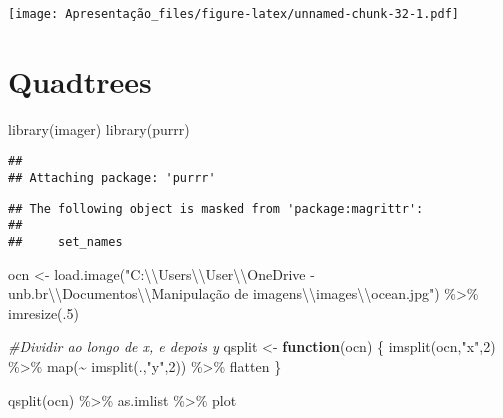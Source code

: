 \documentclass[
]{article}
\newenvironment{Shaded}{\begin{snugshade}}{\end{snugshade}}
\newcommand{\CommentTok}[1]{\textcolor[rgb]{0.56,0.35,0.01}{\textit{#1}}}
\newcommand{\ControlFlowTok}[1]{\textcolor[rgb]{0.13,0.29,0.53}{\textbf{#1}}}
\newcommand{\DecValTok}[1]{\textcolor[rgb]{0.00,0.00,0.81}{#1}}
\newcommand{\FunctionTok}[1]{\textcolor[rgb]{0.00,0.00,0.00}{#1}}
\newcommand{\NormalTok}[1]{#1}
\newcommand{\OtherTok}[1]{\textcolor[rgb]{0.56,0.35,0.01}{#1}}
\newcommand{\SpecialCharTok}[1]{\textcolor[rgb]{0.00,0.00,0.00}{#1}}
\newcommand{\StringTok}[1]{\textcolor[rgb]{0.31,0.60,0.02}{#1}}
\begin{document}
\texttt{[image: Apresentação\_files/figure-latex/unnamed-chunk-32-1.pdf]}

\hypertarget{quadtrees}{%
\section{Quadtrees}\label{quadtrees}}

\begin{Shaded}
\begin{Highlighting}[]
\FunctionTok{library}\NormalTok{(imager)}
\FunctionTok{library}\NormalTok{(purrr)}
\end{Highlighting}
\end{Shaded}

\begin{verbatim}
## 
## Attaching package: 'purrr'
\end{verbatim}

\begin{verbatim}
## The following object is masked from 'package:magrittr':
## 
##     set_names
\end{verbatim}

\begin{Shaded}
\begin{Highlighting}[]
\NormalTok{ocn }\OtherTok{\textless{}{-}} \FunctionTok{load.image}\NormalTok{(}\StringTok{"C:}\SpecialCharTok{\textbackslash{}\textbackslash{}}\StringTok{Users}\SpecialCharTok{\textbackslash{}\textbackslash{}}\StringTok{User}\SpecialCharTok{\textbackslash{}\textbackslash{}}\StringTok{OneDrive {-} unb.br}\SpecialCharTok{\textbackslash{}\textbackslash{}}\StringTok{Documentos}\SpecialCharTok{\textbackslash{}\textbackslash{}}\StringTok{Manipulação de imagens}\SpecialCharTok{\textbackslash{}\textbackslash{}}\StringTok{images}\SpecialCharTok{\textbackslash{}\textbackslash{}}\StringTok{ocean.jpg"}\NormalTok{) }\SpecialCharTok{\%\textgreater{}\%} \FunctionTok{imresize}\NormalTok{(.}\DecValTok{5}\NormalTok{)}

\CommentTok{\#Dividir ao longo de x, e depois y}
\NormalTok{qsplit }\OtherTok{\textless{}{-}} \ControlFlowTok{function}\NormalTok{(ocn)}
\NormalTok{\{}
    \FunctionTok{imsplit}\NormalTok{(ocn,}\StringTok{"x"}\NormalTok{,}\DecValTok{2}\NormalTok{) }\SpecialCharTok{\%\textgreater{}\%} \FunctionTok{map}\NormalTok{(}\SpecialCharTok{\textasciitilde{}} \FunctionTok{imsplit}\NormalTok{(.,}\StringTok{"y"}\NormalTok{,}\DecValTok{2}\NormalTok{)) }\SpecialCharTok{\%\textgreater{}\%}
\NormalTok{        flatten }
\NormalTok{\}}

\FunctionTok{qsplit}\NormalTok{(ocn) }\SpecialCharTok{\%\textgreater{}\%}\NormalTok{ as.imlist }\SpecialCharTok{\%\textgreater{}\%}\NormalTok{ plot}
\end{Highlighting}
\end{Shaded}
\end{document}
